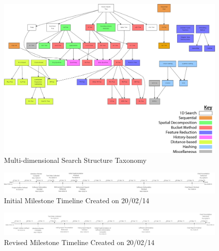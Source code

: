 \begin{landscape}	

\null  %
\nointerlineskip  %
\vfill
\let\snewpage \newpage
\let\newpage \relax
	\begin{figure}[H]
		\centering
		\includegraphics[scale=0.35]{figures/md_structure_taxonomy.png}
		\caption{Multi-dimensional Search Structure Taxonomy}
		\label{fig:structure-taxonomy}
	\end{figure}
\let \newpage \snewpage
\vfill 
\break %

	\newpage

\null  %
\nointerlineskip  %
\vfill
\let\snewpage \newpage
\let\newpage \relax
	\begin{figure}[H]
		\centering
		\centerline{ \includegraphics[scale=0.5]{figures/initial_schedule_timeline.pdf} }
		\caption{Initial Milestone Timeline Created on 20/02/14}
		\label{fig:initial-milestone-timeline}
	\end{figure}

	\begin{figure}[H]
		\centering
		\centerline{ \includegraphics[scale=0.37]{figures/revised_schedule_timeline.pdf} }
		\caption{Revised Milestone Timeline Created on 20/02/14}
		\label{fig:revised-milestone-timeline}
	\end{figure}	
\let \newpage \snewpage
\vfill 
\break %

\end{landscape}

